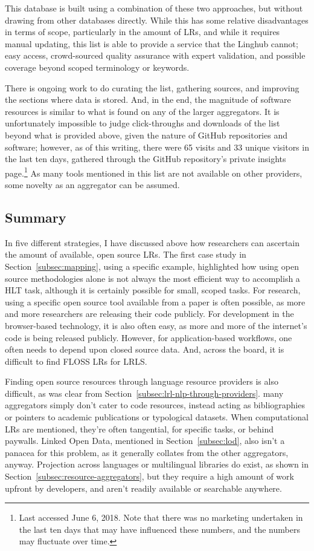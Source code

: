 This database is built using a combination of these two approaches, but without drawing from other databases directly. While this has some relative disadvantages in terms of scope, particularly in the amount of LRs, and while it requires manual updating, this list is able to provide a service that the Linghub cannot; easy access, crowd-sourced quality assurance with expert validation, and possible coverage beyond scoped terminology or keywords. 

There is ongoing work to do curating the list, gathering sources, and improving the sections where data is stored. And, in the end, the magnitude of software resources is similar to what is found on any of the larger aggregators. It is unfortunately impossible to judge click-throughs and downloads of the list beyond what is provided above, given the nature of GitHub repositories and software; however, as of this writing, there were 65 visits and 33 unique visitors in the last ten days, gathered through the GitHub repository's private insights page.\footnote{Last accessed June 6, 2018. Note that there was no marketing undertaken in the last ten days that may have influenced these numbers, and the numbers may fluctuate over time.} As many tools mentioned in this list are not available on other providers, some novelty as an aggregator can be assumed.

\subsection{Summary}
\label{subsec:lrl-summary}

In five different strategies, I have discussed above how researchers can ascertain the amount of available, open source LRs. The first case study in Section~\ref{subsec:mapping}, using a specific example, highlighted how using open source methodologies alone is not always the most efficient way to accomplish a HLT task, although it is certainly possible for small, scoped tasks. For research, using a specific open source tool available from a paper is often possible, as more and more researchers are releasing their code publicly. For development in the browser-based technology, it is also often easy, as more and more of the internet's code is being released publicly. However, for application-based workflows, one often needs to depend upon closed source data. And, across the board, it is difficult to find FLOSS LRs for LRLS. 

Finding open source resources through language resource providers is also difficult, as was clear from Section~\ref{subsec:lrl-nlp-through-providers}. many aggregators simply don't cater to code resources, instead acting as bibliographies or pointers to academic publications or typological datasets. When computational LRs are mentioned, they're often tangential, for specific tasks, or behind paywalls. Linked Open Data, mentioned in Section~\ref{subsec:lod}, also isn't a panacea for this problem, as it generally collates from the other aggregators, anyway. Projection across languages or multilingual libraries do exist, as shown in Section~\ref{subsec:resource-aggregators}, but they require a high amount of work upfront by developers, and aren't readily available or searchable anywhere. 

